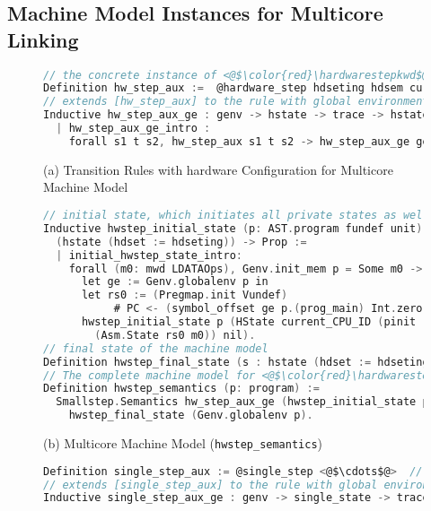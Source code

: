 
\subsection{Machine Model Instances for Multicore Linking}
\label{chapter:certikos:subsec:intermediate-machine-instantiation}



\begin{figure}
\begin{lstlisting}[language=C]
// the concrete instance of <@$\color{red}\hardwarestepkwd$@>
Definition hw_step_aux :=  @hardware_step hdseting hdsem current_CPU_ID.
// extends [hw_step_aux] to the rule with global environment  
Inductive hw_step_aux_ge : genv -> hstate -> trace -> hstate -> Prop :=
  | hw_step_aux_ge_intro : 
    forall s1 t s2, hw_step_aux s1 t s2 -> hw_step_aux_ge ge s1 t s2.
\end{lstlisting}
\begin{center}
(a) Transition Rules with hardware Configuration for Multicore Machine Model
\end{center}
\begin{lstlisting}[language=C, deletekeywords={int}]    
// initial state, which initiates all private states as well as a global log
Inductive hwstep_initial_state (p: AST.program fundef unit): 
  (hstate (hdset := hdseting)) -> Prop := 
  | initial_hwstep_state_intro: 
    forall (m0: mwd LDATAOps), Genv.init_mem p = Some m0 ->
      let ge := Genv.globalenv p in
      let rs0 := (Pregmap.init Vundef) 
           # PC <- (symbol_offset ge p.(prog_main) Int.zero) # ESP <- Vzero in
      hwstep_initial_state p (HState current_CPU_ID (pinit (B := core_set)
        (Asm.State rs0 m0)) nil).
// final state of the machine model 
Definition hwstep_final_state (s : hstate (hdset := hdseting)) (i : int) := False.
// The complete machine model for <@$\color{red}\hardwarestepkwd$@> with proper initial and final states  
Definition hwstep_semantics (p: program) :=
  Smallstep.Semantics hw_step_aux_ge (hwstep_initial_state p) 
    hwstep_final_state (Genv.globalenv p).
\end{lstlisting}
\begin{center}
(b) Multicore Machine Model (\lstinline$hwstep_semantics$)
\end{center}
\begin{lstlisting}[language=C]
Definition single_step_aux := @single_step <@$\cdots$@>  // the concrete instance of <@$\color{red}\singlestepkwd$@>
// extends [single_step_aux] to the rule with global environment  
Inductive single_step_aux_ge : genv -> single_state -> trace -> 

\end{lstlisting}
\end{figure}
